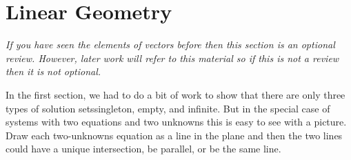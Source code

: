 \section{Linear Geometry}
\textit{If you have seen the elements of vectors before then
this section is an optional review.
However, later work will refer to this material
so if this is not a review then it is not optional.}

In the first section, we had to do a bit of work to show
that there are only three types of solution sets\Dash singleton, empty, and
infinite.
But in the special case of systems with two equations and two unknowns
this is easy to see with a picture.
Draw each two-unknowns equation as a line in the plane and then
the two lines could have a unique intersection, 
be parallel, or be the same line.
